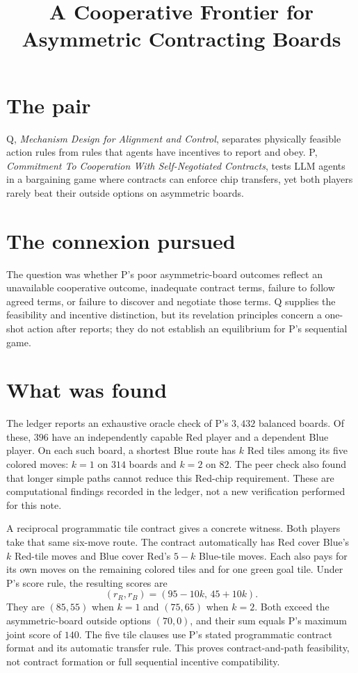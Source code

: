 \documentclass{article}
\title{A Cooperative Frontier for Asymmetric Contracting Boards}
\begin{document}
\maketitle

\section*{The pair}

Q, \emph{Mechanism Design for Alignment and Control}, separates physically feasible action rules from rules that agents have incentives to report and obey. P, \emph{Commitment To Cooperation With Self-Negotiated Contracts}, tests LLM agents in a bargaining game where contracts can enforce chip transfers, yet both players rarely beat their outside options on asymmetric boards.

\section*{The connexion pursued}

The question was whether P's poor asymmetric-board outcomes reflect an unavailable cooperative outcome, inadequate contract terms, failure to follow agreed terms, or failure to discover and negotiate those terms. Q supplies the feasibility and incentive distinction, but its revelation principles concern a one-shot action after reports; they do not establish an equilibrium for P's sequential game. 

\section*{What was found}

The ledger reports an exhaustive oracle check of P's \(3{,}432\) balanced boards. Of these, \(396\) have an independently capable Red player and a dependent Blue player. On each such board, a shortest Blue route has \(k\) Red tiles among its five colored moves: \(k=1\) on \(314\) boards and \(k=2\) on \(82\). The peer check also found that longer simple paths cannot reduce this Red-chip requirement. These are computational findings recorded in the ledger, not a new verification performed for this note. 

A reciprocal programmatic tile contract gives a concrete witness. Both players take that same six-move route. The contract automatically has Red cover Blue's \(k\) Red-tile moves and Blue cover Red's \(5-k\) Blue-tile moves. Each also pays for its own moves on the remaining colored tiles and for one green goal tile. Under P's score rule, the resulting scores are
\[
(r_R,r_B)=(95-10k,\,45+10k).
\]
They are \((85,55)\) when \(k=1\) and \((75,65)\) when \(k=2\). Both exceed the asymmetric-board outside options \((70,0)\), and their sum equals P's maximum joint score of \(140\). The five tile clauses use P's stated programmatic contract format and its automatic transfer rule. This proves contract-and-path feasibility, not contract formation or full sequential incentive compatibility. 
\end{document}

